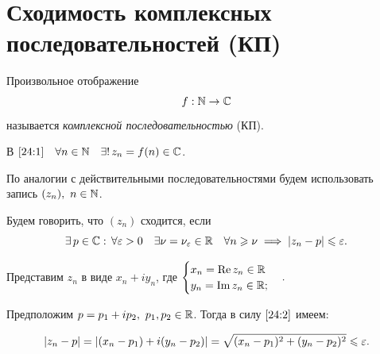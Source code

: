 \documentclass[../../main.tex]{subfiles}
\begin{document}
\section{Сходимость комплексных последовательностей (КП)}

Произвольное отображение
\begin{equation}\label{24:1}
f: \mathbb{N} \to \mathbb{C}
\end{equation}
называется \emph{комплексной последовательностью} (КП).

В $ \eqref{24:1} \quad \forall n \in \mathbb{N} \quad \exists!\, z_n = f(n) \in \mathbb{C} 
$.

По аналогии с действительными последовательностями будем использовать запись $ 
(z_n),\ n \in \mathbb{N} $.

Будем говорить, что $ (z_n) $ сходится, если
\begin{equation}\label{24:2}
	\exists\, p \in \mathbb{C} :\, \forall \varepsilon > 0\quad \exists \nu = \nu_\varepsilon \in \mathbb{R} 
	\quad 
	\forall n \geqslant \nu \implies |z_n - p| \leqslant \varepsilon.
\end{equation}

Представим $ z_n $ в виде $x_n + i y_n$, где
$\begin{cases}
x_n = \operatorname{Re} z_n \in \mathbb{R} \\
y_n = \operatorname{Im} z_n \in \mathbb{R};
\end{cases}.$

Предположим $ p = p_1 + i p_2,\ p_1, p_2 \in \mathbb{R} $. Тогда в силу $ \eqref{24:2} 
$ имеем:

\begin{equation}\label{24:3}
	|z_n - p| = |(x_n - p_1) + i(y_n - p_2)| = \sqrt{(x_n - p_1)^2 + (y_n - 
	p_2)^2} \leqslant \varepsilon.
\end{equation}
\end{document}
